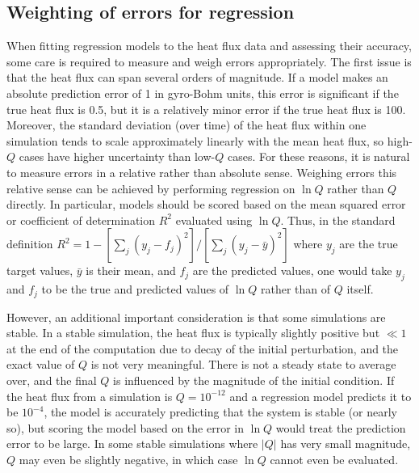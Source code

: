 \documentclass{jpp}
\newcommand{\changed}[1]{{#1}}
\begin{document}

\subsection{Weighting of errors for regression}

When fitting regression models to the heat flux data and assessing their accuracy, some care is required to measure and weigh errors appropriately.
The first issue is that the heat flux can span several orders of magnitude.
If a model makes an absolute prediction error of 1 in gyro-Bohm units, this error is significant if the true heat flux is 0.5, but it is a relatively minor error if the true heat flux is 100.
Moreover, the standard deviation (over time) of the heat flux within one simulation tends to scale approximately linearly with the mean heat flux, so high-$Q$ cases have higher uncertainty than low-$Q$ cases.
For these reasons, it is natural to measure errors in a relative rather than absolute sense.
Weighing errors this relative sense can be achieved by performing regression on $\ln Q$ rather than $Q$ directly.
In particular, models should be scored based on the mean squared error or coefficient of determination $R^2$ evaluated using $\ln Q$.
\changed{Thus, in the standard definition $R^2 = 1-\left[\sum_j (y_j-f_j)^2\right]/\left[\sum_j (y_j - \bar{y})^2\right]$ where $y_j$ are the true target values, $\bar{y}$ is their mean, and $f_j$ are the predicted values, one would take $y_j$ and $f_j$ to be the true and predicted values of $\ln Q$ rather than of $Q$ itself.}

However, an additional important consideration is that some simulations are stable.
In a stable simulation, the heat flux is typically slightly positive but $\ll 1$ at the end of the computation due to decay of the initial perturbation, and the exact value of $Q$ is not very meaningful.
There is not a steady state to average over, and the final $Q$ is influenced by the magnitude of the initial condition.
If the heat flux from a simulation is $Q=10^{-12}$ and a regression model predicts it to be $10^{-4}$, the model is accurately predicting that the system is stable (or nearly so), but scoring the model based on the error in $\ln Q$ would treat the prediction error to be large.
In some stable simulations where $|Q|$ has very small magnitude, $Q$ may even be slightly negative, in which case $\ln Q$ cannot even be evaluated.
\end{document}
